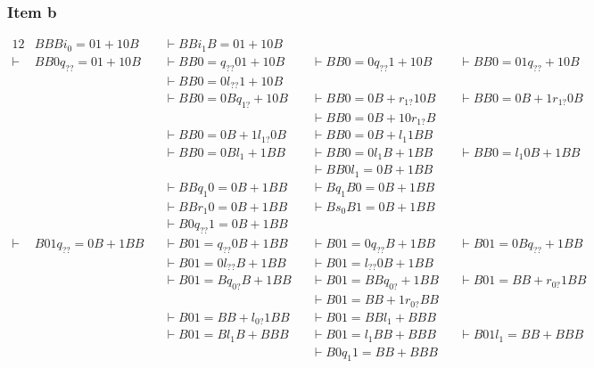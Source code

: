\documentclass[docid=TP11]{tcom_TP}
\begin{document}
{\subsubsection{Item b}
\begin{alignat*}{12}
	       & BBB i_0 =01+10B    &&\vdash BB i_1 B=01+10B    && \\
	\vdash & BB0 q_{??} =01+10B &&\vdash BB0= q_{??} 01+10B &&\vdash BB0=0 q_{??} 1+10B &&\vdash BB0=01 q_{??} +10B &&\\
	       &                    &&\vdash BB0=0 l_{??} 1+10B &&\\
		   &                    &&\vdash BB0=0B q_{1?} +10B &&\vdash BB0=0B+ r_{1?} 10B &&\vdash BB0=0B+1 r_{1?} 0B &&\\
		   &                    &&                          &&\vdash BB0=0B+10 r_{1?} B &&\\
		   &                    &&\vdash BB0=0B+1 l_{1?} 0B &&\vdash BB0=0B+ l_{1 } 1BB &&\\
		   &                    &&\vdash BB0=0B l_{1 } +1BB &&\vdash BB0=0 l_{1 } B+1BB &&\vdash BB0= l_{1 } 0B+1BB &&\\
		   &                    &&                          &&\vdash BB0 l_{1 } =0B+1BB &&\\
		   &                    &&\vdash BB q_{1 } 0=0B+1BB &&\vdash B q_{1 } B0=0B+1BB &&\\
		   &                    &&\vdash BB r_{1 } 0=0B+1BB &&\vdash B s_0 B1=0B+1BB    &&\\
		   &                    &&\vdash B0 q_{??} 1=0B+1BB &&\\
	\vdash & B01 q_{??} =0B+1BB &&\vdash B01= q_{??} 0B+1BB &&\vdash B01=0 q_{??} B+1BB &&\vdash B01=0B q_{??} +1BB &&\\
		   &                    &&\vdash B01=0 l_{??} B+1BB &&\vdash B01= l_{??} 0B+1BB &&\\
		   &                    &&\vdash B01=B q_{0?} B+1BB &&\vdash B01=BB q_{0?} +1BB &&\vdash B01=BB+ r_{0?} 1BB &&\\
		   &                    &&                          &&\vdash B01=BB+1 r_{0?} BB &&\\
		   &                    &&\vdash B01=BB+ l_{0?} 1BB &&\vdash B01=BB l_{1 } +BBB &&\\
		   &                    &&\vdash B01=B l_{1 } B+BBB &&\vdash B01= l_{1 } BB+BBB &&\vdash B01 l_{1 } =BB+BBB &&\\
		   &                    &&                          &&\vdash B0 q_{1 } 1=BB+BBB &&\\

\end{alignat*}}
\end{document}

